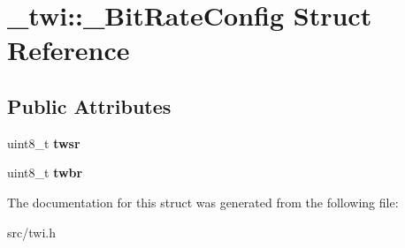 \hypertarget{struct__twi_1_1__BitRateConfig}{}\section{\+\_\+twi\+:\+:\+\_\+\+Bit\+Rate\+Config Struct Reference}
\label{struct__twi_1_1__BitRateConfig}
\subsection*{Public Attributes}
\begin{DoxyCompactItemize}
\item 
\hypertarget{struct__twi_1_1__BitRateConfig_a7c3c8ecc3276d0f9e34474a6743d27f7}{}\label{struct__twi_1_1__BitRateConfig_a7c3c8ecc3276d0f9e34474a6743d27f7} 
uint8\+\_\+t {\bfseries twsr}
\item 
\hypertarget{struct__twi_1_1__BitRateConfig_aee21fcb17d9fc2bfde8498eb031f03e9}{}\label{struct__twi_1_1__BitRateConfig_aee21fcb17d9fc2bfde8498eb031f03e9} 
uint8\+\_\+t {\bfseries twbr}
\end{DoxyCompactItemize}


The documentation for this struct was generated from the following file\+:\begin{DoxyCompactItemize}
\item 
src/twi.\+h\end{DoxyCompactItemize}
